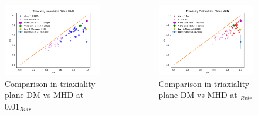 \documentclass[xcolor=dvipsnames]{beamer}
\begin{document}
\begin{frame}[plain]

\begin{columns}[c]

\begin{column}{.5\textwidth}
\begin{figure}
\includegraphics[width=1.1\columnwidth]{./pics/Triaxiality_Inner.png}
\caption{\tiny Comparison in triaxiality plane DM vs MHD at $0.01_{Rvir}$}
\end{figure}
\end{column}

\begin{column}{.5\textwidth}
\centering
\begin{figure}
\includegraphics[width=1.1\columnwidth]{./pics/Triaxiality_Outer.png}
\caption{\tiny \tiny Comparison in triaxiality plane DM vs MHD at $_{Rvir}$}
\end{figure}

\end{column}

\end{columns}


\end{frame}
\end{document}
